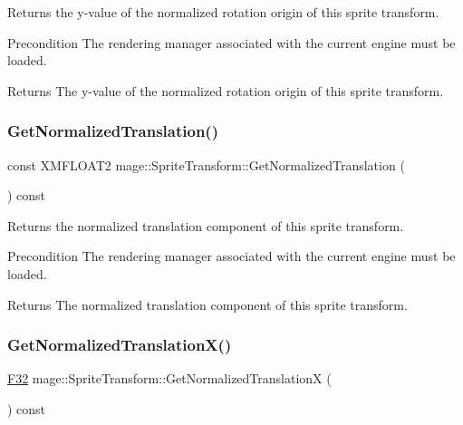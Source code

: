 Returns the y-\/value of the normalized rotation origin of this sprite transform.

\begin{DoxyPrecond}{Precondition}
The rendering manager associated with the current engine must be loaded. 
\end{DoxyPrecond}
\begin{DoxyReturn}{Returns}
The y-\/value of the normalized rotation origin of this sprite transform. 
\end{DoxyReturn}
\hypertarget{structmage_1_1_sprite_transform_a35b4a512d853e08743948f8065d1558f}{}\label{structmage_1_1_sprite_transform_a35b4a512d853e08743948f8065d1558f} 
\subsubsection{\texorpdfstring{Get\+Normalized\+Translation()}{GetNormalizedTranslation()}}
{\footnotesize\ttfamily const X\+M\+F\+L\+O\+A\+T2 mage\+::\+Sprite\+Transform\+::\+Get\+Normalized\+Translation (\begin{DoxyParamCaption}{ }\end{DoxyParamCaption}) const}

Returns the normalized translation component of this sprite transform.

\begin{DoxyPrecond}{Precondition}
The rendering manager associated with the current engine must be loaded. 
\end{DoxyPrecond}
\begin{DoxyReturn}{Returns}
The normalized translation component of this sprite transform. 
\end{DoxyReturn}
\hypertarget{structmage_1_1_sprite_transform_a31bf43cccaf564054930d80e229ebef3}{}\label{structmage_1_1_sprite_transform_a31bf43cccaf564054930d80e229ebef3} 
\subsubsection{\texorpdfstring{Get\+Normalized\+Translation\+X()}{GetNormalizedTranslationX()}}
{\footnotesize\ttfamily \hyperlink{namespacemage_aa97e833b45f06d60a0a9c4fc22ae02c0}{F32} mage\+::\+Sprite\+Transform\+::\+Get\+Normalized\+TranslationX (\begin{DoxyParamCaption}{ }\end{DoxyParamCaption}) const}

